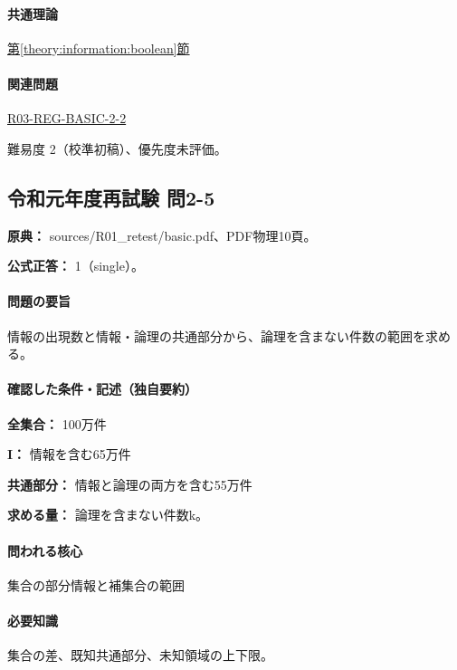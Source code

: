 \paragraph{共通理論} \hyperref[theory:information:boolean]{第\ref*{theory:information:boolean}節}

\paragraph{関連問題} \hyperref[q:r03-reg-basic-2-2]{R03-REG-BASIC-2-2}

\par 難易度 2（校準初稿）、優先度未評価。

\subsection{令和元年度再試験 問2-5}
\label{q:r01-ret-basic-2-5}

\noindent\textbf{原典：} sources/R01\_retest/basic.pdf、PDF物理10頁。

\textbf{公式正答：} 1（single）。

\paragraph{問題の要旨} 情報の出現数と情報・論理の共通部分から、論理を含まない件数の範囲を求める。

\paragraph{確認した条件・記述（独自要約）}\mbox{}\par

\noindent\textbf{全集合：} 100万件\par

\noindent\textbf{I：} 情報を含む65万件\par

\noindent\textbf{共通部分：} 情報と論理の両方を含む55万件\par

\noindent\textbf{求める量：} 論理を含まない件数k。\par

\paragraph{問われる核心} 集合の部分情報と補集合の範囲

\paragraph{必要知識} 集合の差、既知共通部分、未知領域の上下限。

